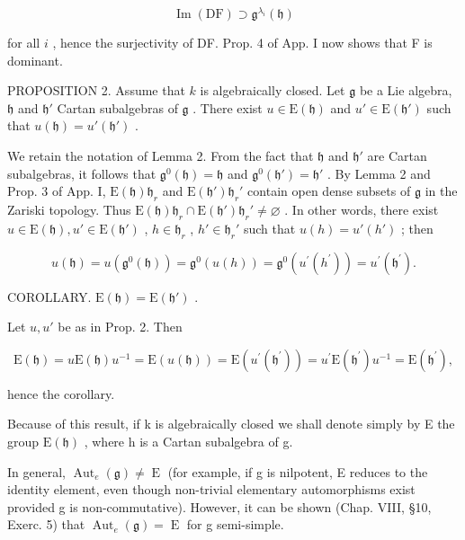 \[
\operatorname{Im} (\mathrm{DF}) \supset \mathfrak {g} ^ {\lambda_ {i}} (\mathfrak {h})
\]

for all \(i\) , hence the surjectivity of DF. Prop. 4 of App. I now shows that F is dominant.

PROPOSITION 2. Assume that \(k\) is algebraically closed. Let \(\mathfrak{g}\) be a Lie algebra, \(\mathfrak{h}\) and \(\mathfrak{h}'\) Cartan subalgebras of \(\mathfrak{g}\) . There exist \(u \in \mathrm{E}(\mathfrak{h})\) and \(u' \in \mathrm{E}(\mathfrak{h}')\) such that \(u(\mathfrak{h}) = u'(\mathfrak{h}')\) .

We retain the notation of Lemma 2. From the fact that \(\mathfrak{h}\) and \(\mathfrak{h}'\) are Cartan subalgebras, it follows that \(\mathfrak{g}^0 (\mathfrak{h}) = \mathfrak{h}\) and \(\mathfrak{g}^0 (\mathfrak{h}') = \mathfrak{h}'\) . By Lemma 2 and Prop. 3 of App. I, \(\mathrm{E}(\mathfrak{h})\mathfrak{h}_r\) and \(\mathrm{E}(\mathfrak{h}')\mathfrak{h}_r'\) contain open dense subsets of \(\mathfrak{g}\) in the Zariski topology. Thus \(\mathrm{E}(\mathfrak{h})\mathfrak{h}_r\cap \mathrm{E}(\mathfrak{h}')\mathfrak{h}_r' \neq \varnothing\) . In other words, there exist \(u\in \mathrm{E}(\mathfrak{h}), u' \in \mathrm{E}(\mathfrak{h}')\) , \(h\in \mathfrak{h}_r\) , \(h' \in \mathfrak{h}_r'\) such that \(u(h) = u'(h')\) ; then

\[
u (\mathfrak {h}) = u \left(\mathfrak {g} ^ {0} (\mathfrak {h})\right) = \mathfrak {g} ^ {0} (u (h)) = \mathfrak {g} ^ {0} \left(u ^ {\prime} \left(h ^ {\prime}\right)\right) = u ^ {\prime} \left(\mathfrak {h} ^ {\prime}\right).
\]

COROLLARY. \(\mathrm{E}(\mathfrak{h}) = \mathrm{E}(\mathfrak{h}')\) .

Let \(u, u'\) be as in Prop. 2. Then

\[
\mathrm{E} (\mathfrak {h}) = u \mathrm{E} (\mathfrak {h}) u ^ {- 1} = \mathrm{E} (u (\mathfrak {h})) = \mathrm{E} (u ^ {\prime} (\mathfrak {h} ^ {\prime})) = u ^ {\prime} \mathrm{E} (\mathfrak {h} ^ {\prime}) u ^ {- 1} = \mathrm{E} (\mathfrak {h} ^ {\prime}),
\]

hence the corollary.

Because of this result, if k is algebraically closed we shall denote simply by E the group \(\mathrm{E}(\mathfrak{h})\) , where h is a Cartan subalgebra of g.

In general, \(\operatorname{Aut}_{e}(\mathfrak{g}) \neq \operatorname{E}\) (for example, if g is nilpotent, E reduces to the identity element, even though non-trivial elementary automorphisms exist provided g is non-commutative). However, it can be shown (Chap. VIII, §10, Exerc. 5) that \(\operatorname{Aut}_{e}(\mathfrak{g}) = \operatorname{E}\) for g semi-simple.

